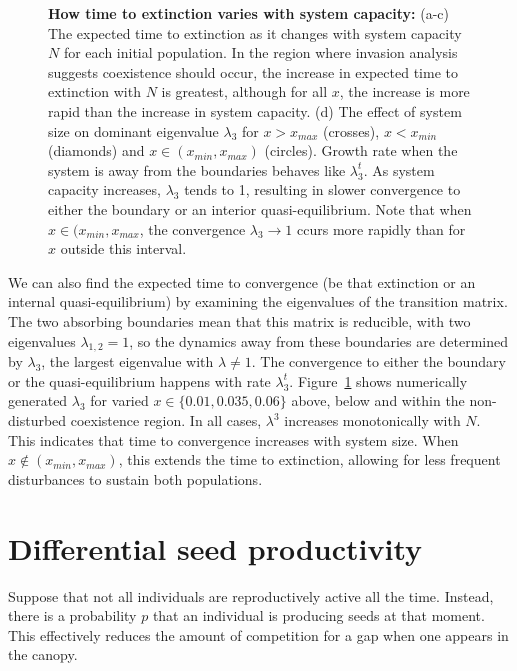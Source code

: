 \begin{figure}[th]
   \caption[How time to extinction varies with system capacity]{\textbf{How time to extinction varies with system capacity: }(a-c) The expected time to extinction as it changes with system capacity $N$ for each initial population. In the region where invasion analysis suggests coexistence should occur, the increase in expected time to extinction with $N$ is greatest, although for all $x$, the increase is more rapid than the increase in system capacity. (d) The effect of system size on dominant eigenvalue $\lambda_3$ for $x>x_{max}$ (crosses), $x<x_{min}$ (diamonds) and $x \in(x_{min},x_{max})$ (circles). Growth rate when the system is away from the boundaries behaves like $\lambda_3^t$. As system capacity increases, $\lambda_3$ tends to 1, resulting in slower convergence to either the boundary or an interior quasi-equilibrium. Note that when $x \in (x_{min},x_{max}$, the convergence $\lambda_3 \to 1$ ccurs more rapidly than for $x$ outside this interval.}
 \label{fig:tte}
\end{figure}

We can also find the expected time to convergence (be that extinction or an internal quasi-equilibrium) by examining the eigenvalues of the transition matrix. The two absorbing boundaries mean that this matrix is reducible, with two eigenvalues $\lambda_{1,2}=1$, so the dynamics away from these boundaries are determined by $\lambda_3$, the largest eigenvalue with $\lambda \neq 1$. The convergence to either the boundary or the quasi-equilibrium happens with rate $\lambda_3^t$. Figure~\ref{fig:tte} shows numerically generated $\lambda_3$ for varied $x \in \{0.01,0.035,0.06\}$ above, below and within the non-disturbed coexistence region. In all cases, $\lambda^3$ increases monotonically with $N$. This indicates that time to convergence increases with system size. When $x \not\in (x_{min},x_{max})$, this extends the time to extinction, allowing for less frequent disturbances to sustain both populations.



 \section{Differential seed productivity}
\label{app2c}
Suppose that not all individuals are reproductively active all the time. Instead, there is a probability  $p$ that an individual is producing seeds at that moment. This effectively reduces the amount of competition for a gap when one appears in the canopy.

